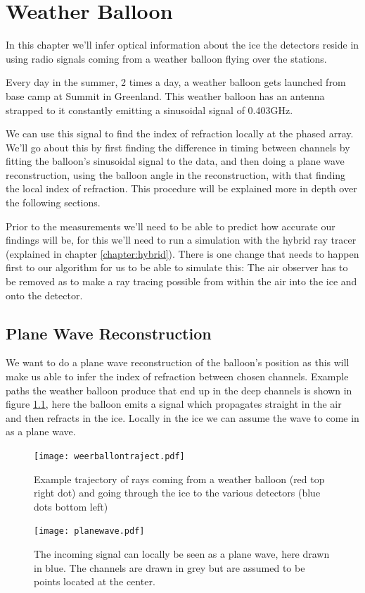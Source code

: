 \chapter{Weather Balloon}
\label{chap:WB}
In this chapter we'll infer optical information about the ice the detectors reside in
using radio signals coming from a weather balloon flying over the stations. 

Every day in the summer, 2 times a day, a weather balloon gets launched
from base camp at Summit in Greenland. This weather balloon has an antenna
strapped to it constantly emitting a sinusoidal signal of 0.403GHz.

We can use this signal to find the index of refraction locally at the phased
array.  We'll go about this by first finding the difference in timing between
channels by fitting the balloon's sinusoidal signal to the data, and then doing
a plane wave reconstruction, using the balloon angle in the reconstruction, 
with that finding the local index of refraction.  This procedure will
be explained more in depth over the following sections.

Prior to the measurements we'll need to be able to predict how accurate our
findings will be, for this we'll need to run a simulation with the hybrid ray
tracer (explained in chapter \ref{chapter:hybrid}).  
There is one change that needs to happen first to our algorithm for us
to be able to simulate this: The air observer has to be removed as to make a
ray tracing possible from within the air into the ice and onto the detector\cite{hybrid}.

\section{Plane Wave Reconstruction}
We want to do a plane wave reconstruction of the balloon's position as this
will make us able to infer the index of refraction between chosen channels.
Example paths the weather balloon produce that end up in the deep channels is
shown in figure \ref{fig:Example trajectory}, here the balloon emits a signal
which propagates straight in the air and then refracts in the ice. Locally in
the ice we can assume the wave to come in as a plane wave.
\begin{figure}
	\centering
	\texttt{[image: weerballontraject.pdf]}
	\caption{Example trajectory of rays coming from a weather balloon (red top right dot) and going through the ice to the various detectors (blue dots bottom left)}
	\label{fig:Example trajectory}
\end{figure}
\begin{figure}
	\centering
	\texttt{[image: planewave.pdf]}
	\caption{The incoming signal can locally be seen as a plane wave, here drawn in blue. The channels are drawn in grey but are assumed to be points located at the center.}	
	\label{fig:Plane Wave}
\end{figure}

